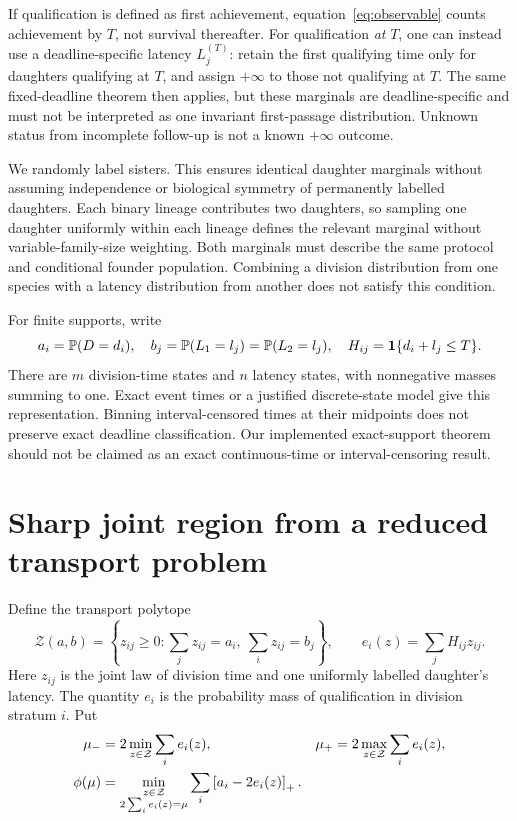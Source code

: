 \documentclass[11pt]{article}
\begin{document}
If qualification is defined as first achievement, equation~\eqref{eq:observable} counts achievement by $T$, not survival thereafter. For qualification \emph{at} $T$, one can instead use a deadline-specific latency $L_j^{(T)}$: retain the first qualifying time only for daughters qualifying at $T$, and assign $+\infty$ to those not qualifying at $T$. The same fixed-deadline theorem then applies, but these marginals are deadline-specific and must not be interpreted as one invariant first-passage distribution. Unknown status from incomplete follow-up is not a known $+\infty$ outcome.

We randomly label sisters. This ensures identical daughter marginals without assuming independence or biological symmetry of permanently labelled daughters. Each binary lineage contributes two daughters, so sampling one daughter uniformly within each lineage defines the relevant marginal without variable-family-size weighting. Both marginals must describe the same protocol and conditional founder population. Combining a division distribution from one species with a latency distribution from another does not satisfy this condition.

For finite supports, write
\begin{equation}
 a_i=\mathbb P(D=d_i),\quad b_j=\mathbb P(L_1=l_j)=\mathbb P(L_2=l_j),\quad
 H_{ij}=\mathbf1\{d_i+l_j\leq T\}.
\end{equation}
There are $m$ division-time states and $n$ latency states, with nonnegative masses summing to one. Exact event times or a justified discrete-state model give this representation. Binning interval-censored times at their midpoints does not preserve exact deadline classification. Our implemented exact-support theorem should not be claimed as an exact continuous-time or interval-censoring result.

\section{Sharp joint region from a reduced transport problem}
Define the transport polytope
\begin{equation}
 \mathcal Z(a,b)=\left\{z_{ij}\geq0:\sum_jz_{ij}=a_i,\ \sum_i z_{ij}=b_j\right\},\qquad
 e_i(z)=\sum_jH_{ij}z_{ij}.
\end{equation}
Here $z_{ij}$ is the joint law of division time and one uniformly labelled daughter's latency. The quantity $e_i$ is the probability mass of qualification in division stratum $i$. Put
\begin{align}
 \mu_-&=2\min_{z\in\mathcal Z}\sum_i e_i(z),&
 \mu_+&=2\max_{z\in\mathcal Z}\sum_i e_i(z),\label{eq:means}\\
 \phi(\mu)&=\min_{\substack{z\in\mathcal Z\\2\sum_i e_i(z)=\mu}}
 \sum_i\left[a_i-2e_i(z)\right]_+.\label{eq:phi}
\end{align}
\end{document}
